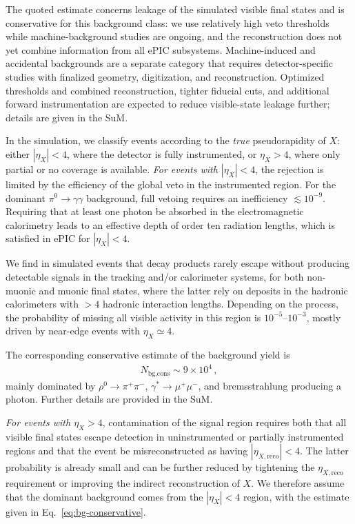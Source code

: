\documentclass[aps,prd,preprintnumbers,superscriptaddress,nofootinbib,floatfix,twocolumn,notitlepage,reprint]{revtex4-2}
\begin{document}
The quoted estimate concerns leakage of the simulated visible final states and is conservative for this background class: we use relatively high veto thresholds while machine-background studies are ongoing, and the reconstruction does not yet combine information from all ePIC subsystems.
Machine-induced and accidental backgrounds are a separate category that requires detector-specific studies with finalized geometry, digitization, and reconstruction.
Optimized thresholds and combined reconstruction, tighter fiducial cuts, and additional forward instrumentation are expected to reduce visible-state leakage further; details are given in the SuM.

In the simulation, we classify events according to the \emph{true} pseudorapidity of $X$: either $|\eta_X|<4$, where the detector is fully instrumented, or $\eta_X>4$, where only partial or no coverage is available. 
\emph{For events with $|\eta_X|<4$}, the rejection is limited by the efficiency of the global veto in the instrumented region. 
For the dominant $\pi^{0}\to \gamma\gamma$ background, full vetoing requires an inefficiency $\lesssim 10^{-9}$. Requiring that at least one photon be absorbed in the electromagnetic calorimetry leads to an effective depth of order ten radiation lengths, which is satisfied in ePIC for $|\eta_X|<4$.

We find in simulated events that decay products rarely escape without producing detectable signals in the tracking and/or calorimeter systems, for both non-muonic and muonic final states, where the latter rely on deposits in the hadronic calorimeters with $>4$ hadronic interaction lengths. 
Depending on the process, the probability of missing all visible activity in this region is $10^{-5}$--$10^{-3}$, mostly driven by near-edge events with $\eta_X\simeq 4$.
 
The corresponding conservative estimate of the background yield is
%
\begin{align}
   N_{\text{bg,cons}} \sim  9\times 10^{4}\,,
    \label{eq:bg-conservative}
\end{align}
%
mainly dominated by $\rho^{0}\to \pi^{+}\pi^{-}$, $\gamma^{*}\to \mu^{+}\mu^{-}$, and bremsstrahlung producing a photon. 
Further details are provided in the SuM.

\emph{For events with $\eta_X>4$}, contamination of the signal region requires both that all visible final states escape detection in uninstrumented or partially instrumented regions and that the event be misreconstructed as having $|\eta_{X,\text{reco}}|<4$. 
The latter probability is already small and can be further reduced by tightening the $\eta_{X,\text{reco}}$ requirement or improving the indirect reconstruction of $X$. 
We therefore assume that the dominant background comes from the $|\eta_X|<4$ region, with the estimate given in Eq.~\eqref{eq:bg-conservative}.
\end{document}
